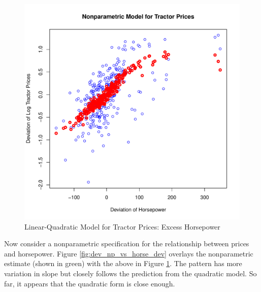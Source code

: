 \documentclass[11pt]{paper}
\begin{document}
\begin{figure}[h!]
  \centering
  \includegraphics[scale = 0.5, keepaspectratio=true]{../Figures/dev_vs_horse_dev}
  \caption{Linear-Quadratic Model for Tractor Prices: Excess Horsepower} \label{fig:dev_vs_horse_dev}
\end{figure}

\clearpage
Now consider a nonparametric specification for 
the relationship between prices and horsepower.
Figure \ref{fig:dev_np_vs_horse_dev} 
overlays the nonparametric estimate (shown in green) with the above in 
Figure \ref{fig:dev_vs_horse_dev}.
The pattern has more variation in slope but 
closely follows the prediction from the quadratic model. 
So far, it appears that the quadratic form
is close enough.
\end{document}
